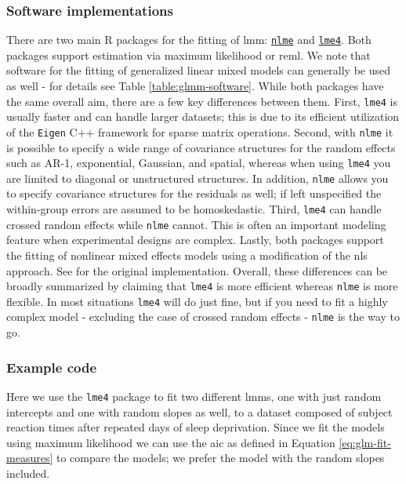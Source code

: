 \documentclass{report}
\begin{document}
\subsubsection{Software implementations}

There are two main R packages for the fitting of \gls{lmm}: \href{https://cran.r-project.org/web/packages/nlme/index.html}{\texttt{nlme}} and \href{https://cran.r-project.org/web/packages/lme4/index.html}{\texttt{lme4}}. Both packages support estimation via maximum likelihood or \gls{reml}. We note that software for the fitting of generalized linear mixed models can generally be used as well - for details see Table \ref{table:glmm-software}. While both packages have the same overall aim, there are a few key differences between them. First, \texttt{lme4} is usually faster and can handle larger datasets; this is due to its efficient utilization of the \texttt{Eigen} C++ framework for sparse matrix operations. Second, with \texttt{nlme} it is possible to specify a wide range of covariance structures for the random effects such as AR-1, exponential, Gaussian, and spatial, whereas when using \texttt{lme4} you are limited to diagonal or unstructured structures. In addition, \texttt{nlme} allows you to specify covariance structures for the residuals as well; if left unspecified the within-group errors are assumed to be homoskedastic. Third, \texttt{lme4} can handle crossed random effects while \texttt{nlme} cannot. This is often an important modeling feature when experimental designs are complex. Lastly, both packages support the fitting of nonlinear mixed effects models using a modification of the \gls{nls} approach. See \cite{lindstrom_nonlinear_1990} for the original implementation. Overall, these differences can be broadly summarized by claiming that \texttt{lme4} is more efficient whereas \texttt{nlme} is more flexible. In most situations \texttt{lme4} will do just fine, but if you need to fit a highly complex model - excluding the case of crossed random effects - \texttt{nlme} is the way to go. 

\subsubsection{Example code}

Here we use the \texttt{lme4} package to fit two different \glspl{lmm}, one with just random intercepts and one with random slopes as well, to a dataset composed of subject reaction times after repeated days of sleep deprivation. Since we fit the models using maximum likelihood we can use the \gls{aic} as defined in Equation \ref{eq:glm-fit-measures} to compare the models; we prefer the model with the random slopes included. 
\end{document}
